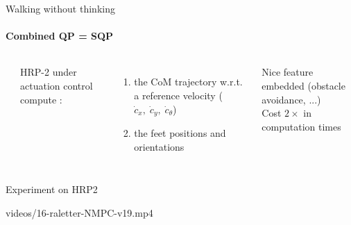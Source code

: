 \begin{frame}[t]{Walking without thinking}
\framesubtitle{Combined QP = SQP}

\begin{columns}[T]

\vspace*{2.5cm}
\begin{minipage}[t]{0.5\textwidth}
  \begin{center}
    \scalebox{0.8}{} \\
  \end{center}
\end{minipage}

\vspace*{1.5cm}
\begin{minipage}[t]{\textwidth}
  HRP-2 under actuation control compute : 
    \begin{enumerate}
    \item the CoM trajectory w.r.t. a
        reference velocity ($\dot{c}_x,\;\dot{c}_y,\;\dot{c}_{\theta} $)
    \item the feet positions and orientations
    \end{enumerate}
  Nice feature embedded (obstacle avoidance, ...)\\
  Cost $2\times$ in computation times
\end{minipage}
\end{columns}
\end{frame}

\begin{frame}{Experiment on HRP2}
  \begin{center}
    {videos/16-raletter-NMPC-v19.mp4}
  \end{center}
\end{frame}

